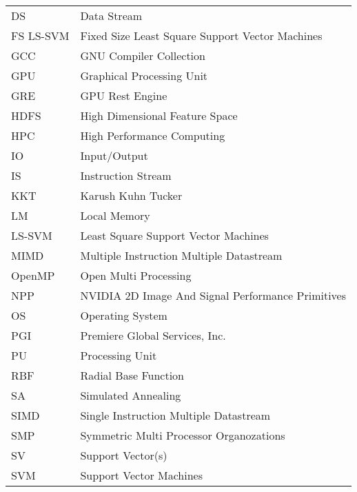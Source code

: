 \begin{longtable}{ll}
	DS        & Data Stream                                                \\
	FS LS-SVM & Fixed Size Least Square Support Vector Machines            \\
	GCC       & GNU Compiler Collection                                    \\
	GPU       & Graphical Processing Unit                                  \\
	GRE       & GPU Rest Engine                                            \\
	HDFS      & High Dimensional Feature Space                             \\
	HPC       & High Performance Computing                                 \\
	IO        & Input/Output                                               \\
	IS        & Instruction Stream                                         \\
	KKT       & Karush Kuhn Tucker                                         \\
	LM        & Local Memory                                               \\
	LS-SVM    & Least Square Support Vector Machines                       \\
	MIMD      & Multiple Instruction Multiple Datastream                   \\
	OpenMP    & Open Multi Processing                                      \\
	NPP       & NVIDIA 2D Image And Signal Performance Primitives          \\
	OS        & Operating System                                           \\
	PGI       & Premiere Global Services, Inc.                             \\
	PU        & Processing Unit                                            \\
	RBF       & Radial Base Function                                       \\
	SA        & Simulated Annealing                                        \\
	SIMD      & Single Instruction Multiple Datastream                     \\
	SMP       & Symmetric Multi Processor Organozations                    \\
	SV        & Support Vector(s)                                          \\
	SVM       & Support Vector Machines               
\end{longtable}
